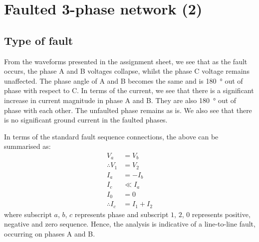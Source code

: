 \section{Faulted 3-phase network (2)}
\subsection{Type of fault}
From the waveforms presented in the assignment sheet, we see that as the fault occurs, the phase A and B voltages collapse, whilst the phase C voltage remains unaffected. The phase angle of A and B becomes the same and is \SI{180}{\degree} out of phase with respect to C. In terms of the current, we see that there is a significant increase in current magnitude in phase A and B. They are also \SI{180}{\degree} out of phase with each other. The unfaulted phase remains as is. We also see that there is no significant ground current in the faulted phases.

In terms of the standard fault sequence connections, the above can be summarised as:
\begin{align}
    V_a            & = V_b       \\
    \therefore V_1 & = V_2       \\
    I_a            & = -I_b      \\
    I_c            & \ll I_a     \\
    I_0            & = 0         \\
    \therefore I_c & = I_1 + I_2
\end{align}
where subscript $a$, $b$, $c$ represents phase and subscript $1$, $2$, $0$ represents positive, negative and zero sequence. Hence, the analysis is indicative of a line-to-line fault, occurring on phases A and B.
